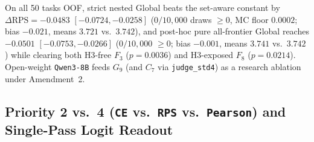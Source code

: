 On all 50 tasks OOF, strict nested Global beats the set-aware constant by $\Delta\mathrm{RPS} = -0.0483$ $[-0.0724, -0.0258]$ ($0/10{,}000$ draws $\ge 0$, MC floor $0.0002$; bias $-0.021$, means $3.721$ vs.\ $3.742$), and post-hoc pure all-frontier Global reaches $-0.0501$ $[-0.0753, -0.0266]$ ($0/10{,}000$ $\ge 0$; bias $-0.001$, means $3.741$ vs.\ $3.742$) while clearing both H3-free $F_3$ ($p=0.0036$) and H3-exposed $F_8$ ($p=0.0214$). Open-weight \texttt{Qwen3-8B} feeds $G_9$ (and $C_7$ via \texttt{judge\_std4}) as a research ablation under Amendment~2.

\subsection*{Priority 2 vs.\ 4 (\texttt{CE} vs.\ \texttt{RPS} vs.\ \texttt{Pearson}) and Single-Pass Logit Readout}
